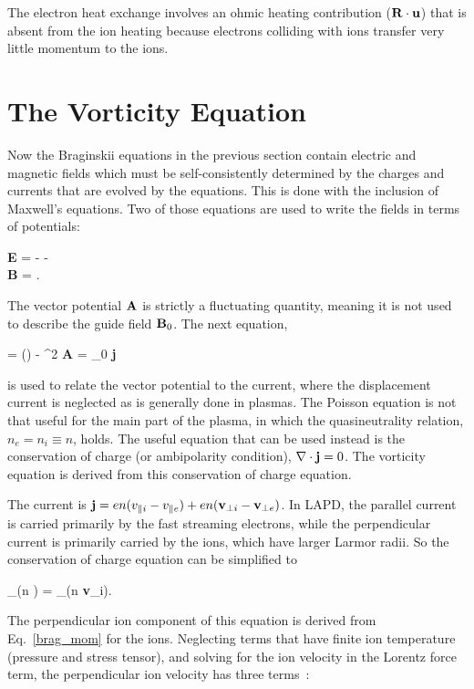 The electron heat exchange involves an ohmic heating contribution (${\bf R \cdot u}$) that is absent from the ion heating because electrons colliding with ions transfer very
little momentum to the ions.

\section{The Vorticity Equation}
\label{s_vorticity_eqn}

Now the Braginskii equations in the previous section contain electric and magnetic fields which must be self-consistently determined by the charges and currents that are evolved by the equations. 
This is done with the inclusion of Maxwell's equations. Two of those equations are used to write the fields in terms of potentials:

\beqar
\label{gauge}
{\bf E} = - \grad \phi -  \\ \nonumber
{\bf B} = \nabla {}.
\eeqar

The vector potential ${\bf A}$ is strictly a fluctuating quantity, meaning it is not used to describe the guide field ${\bf B}_0$.
The next equation,

\beq
\label{maxwell}
\grad {} = \grad(\grad {}) - \grad^2 {\bf A} = \mu_0 {\bf j}
\eeq

is used to relate the vector potential to the current, where the displacement current is neglected as is generally done in plasmas. The Poisson equation is not that useful for the main part
of the plasma, in which the quasineutrality relation, $n_e = n_i \equiv n$, holds. The useful equation that can be used instead is the conservation of charge (or ambipolarity condition), 
$\nabla \cdot {\bf j} = 0$. The vorticity equation is derived from this conservation of charge equation.

The current is ${\bf j} = e n (v_{\parallel i} - v_{\parallel e}) + e n ({\bf v}_{\perp i} - {\bf v}_{\perp e}) $. In LAPD, the parallel current is carried primarily by the fast streaming electrons, while the
perpendicular current is primarily carried by the ions, which have larger Larmor radii. So the conservation of charge equation can be simplified to

\beq
\label{simp_charge_cons}
\nabla_\para (n \vpe) = \nabla_\perp \cdot (n {\bf v}_{\perp i}).
\eeq

The perpendicular ion component of this equation is derived from Eq.~\ref{brag_mom} for the ions. Neglecting terms that have finite ion temperature (pressure and stress tensor), and solving
for the ion velocity in the Lorentz force term, the perpendicular ion velocity has three terms~\cite{Popovich2010a,simakov2003}:

